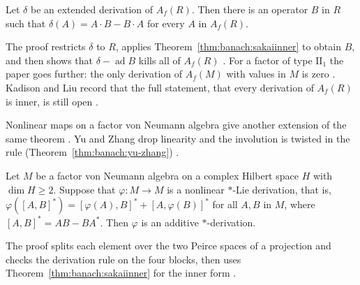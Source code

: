 \begin{theorem}\label{thm:banach:kadison-liu}
Let $\delta$ be an extended derivation of $A_f(R)$. Then there is an operator
$B$ in $R$ such that $\delta(A)=A\cdot B-B\cdot A$ for every $A$ in $A_f(R)$.
\end{theorem}

The proof restricts $\delta$ to $R$, applies
Theorem~\ref{thm:banach:sakaiinner} to obtain $B$, and then shows that
$\delta-\operatorname{ad}B$ kills all of $A_f(R)$
\cite[p.~2090]{KadisonLiu2014Murray}. For a factor of type $\mathrm{II}_1$ the
paper goes further: the only derivation of $A_f(M)$ with values in $M$ is zero
\cite[Theorem~12, p.~2091]{KadisonLiu2014Murray}. Kadison and Liu record that
the full statement, that every derivation of $A_f(R)$ is inner, is still open
\cite[p.~2090]{KadisonLiu2014Murray}.

Nonlinear maps on a factor von Neumann algebra give another extension of the
same theorem \cite[p.~1979]{YuZhang2012StarLie}. Yu and Zhang drop linearity and the involution is twisted in the
rule (Theorem~\ref{thm:banach:yu-zhang}) \cite[p.~1979]{YuZhang2012StarLie}.

\begin{theorem}\label{thm:banach:yu-zhang}
Let $M$ be a factor von Neumann algebra on a complex Hilbert space $H$ with
$\dim H\geq2$. Suppose that $\varphi\colon M\to M$ is a nonlinear $*$-Lie
derivation, that is,
$\varphi([A,B]^*)=[\varphi(A),B]^*+[A,\varphi(B)]^*$ for all $A,B$ in $M$,
where $[A,B]^*=AB-BA^*$. Then $\varphi$ is an additive $*$-derivation.
\end{theorem}

The proof splits each element over the two Peirce spaces of a projection and
checks the derivation rule on the four blocks, then uses
Theorem~\ref{thm:banach:sakaiinner} for the inner form
\cite[pp.~1990--1991]{YuZhang2012StarLie}.


